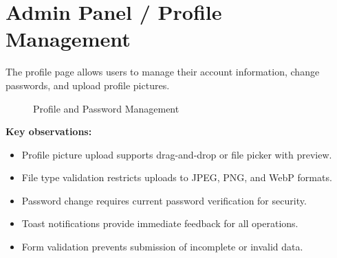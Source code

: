 \section{Admin Panel / Profile Management}

The profile page allows users to manage their account information, change passwords, and upload profile pictures.

\begin{figure}[H]
  \centering
  \begin{minipage}{0.45\textwidth}
    \centering
  \end{minipage}
  \hfill
  \begin{minipage}{0.45\textwidth}
    \centering
  \end{minipage}
  \caption{Profile and Password Management}
  \label{fig:screenshot-profile}
\end{figure}

\textbf{Key observations:}
\begin{itemize}
  \item Profile picture upload supports drag-and-drop or file picker with preview.
  \item File type validation restricts uploads to JPEG, PNG, and WebP formats.
  \item Password change requires current password verification for security.
  \item Toast notifications provide immediate feedback for all operations.
  \item Form validation prevents submission of incomplete or invalid data.
\end{itemize}

